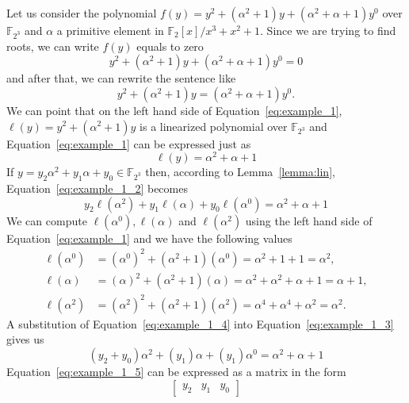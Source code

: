 \begin{example}\label{ex:1}
Let us consider the polynomial $f(y) = y^2 + (\alpha^2+1)y + (\alpha^2 +\alpha +1)y^0$ over $\mathbb{F}_{2^3}$ and $\alpha$ a primitive element in $\mathbb{F}_2[x]/ x^3+x^2+1$. Since we are trying to find roots, we can write $f(y)$ equals to zero
 $$ y^2 + (\alpha^2+1)y + (\alpha^2 +\alpha +1)y^0 = 0$$
 and after that, we can rewrite the sentence like
\begin{equation}\label{eq:example_1}
    y^2 + (\alpha^2+1)y   = (\alpha^2 +\alpha +1)y^0.
\end{equation}
We can point that on the left hand side of Equation~\ref{eq:example_1}, $\ell(y) = y^2 + (\alpha^2+1)y$ is a linearized polynomial over $\mathbb{F}_{2^3}$ and Equation~\ref{eq:example_1} can be expressed just as
\begin{equation}\label{eq:example_1_2}
    \ell(y) = \alpha^2 +\alpha +1
\end{equation}
If $y = y_2\alpha^2 + y_1\alpha + y_0 \in \mathbb{F}_{2^3}$ then, according to Lemma~\ref{lemma:lin}, Equation~\ref{eq:example_1_2} becomes
\begin{equation}\label{eq:example_1_3}
    y_2\ell(\alpha^2) + y_1\ell(\alpha) + y_0\ell(\alpha^0) = \alpha^2 +\alpha +1
\end{equation}
We can compute $\ell(\alpha^0),\ell(\alpha)$ and $\ell(\alpha^2)$ using the left hand side of Equation~\ref{eq:example_1} and we have the following values
\begin{equation}\label{eq:example_1_4}
    \begin{split}
        \ell(\alpha^0) & = (\alpha^0)^2 + (\alpha^2+1)(\alpha^0) = \alpha^2+1 + 1 = \alpha^2, \\
        \ell(\alpha) & = (\alpha)^2 + (\alpha^2+1)(\alpha) = \alpha^2 + \alpha^2+ \alpha + 1 = \alpha + 1, \\
        \ell(\alpha^2) & = (\alpha^2)^2 + (\alpha^2+1)(\alpha^2) = \alpha^4 +\alpha^4 +  \alpha^2 = \alpha^2.
    \end{split}
\end{equation}
A substitution of Equation~\ref{eq:example_1_4} into Equation~\ref{eq:example_1_3} gives us
\begin{equation}\label{eq:example_1_5}
     (y_2+y_0)\alpha^2 + (y_1)\alpha + (y_1)\alpha^0 = \alpha^2 +\alpha +1
\end{equation}
Equation~\ref{eq:example_1_5} can be expressed as a matrix in the form
\begin{equation}\label{eq:example_1_6}
    \begin{bmatrix} y_2 & y_1 & y_0 \end{bmatrix}

\end{equation}
\end{example}
